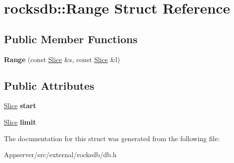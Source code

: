 \hypertarget{structrocksdb_1_1Range}{}\section{rocksdb\+:\+:Range Struct Reference}
\label{structrocksdb_1_1Range}
\subsection*{Public Member Functions}
\begin{DoxyCompactItemize}
\item 
{\bfseries Range} (const \hyperlink{classrocksdb_1_1Slice}{Slice} \&s, const \hyperlink{classrocksdb_1_1Slice}{Slice} \&l)\hypertarget{structrocksdb_1_1Range_aa9e9ddaf19885713b80da61baa7c5ce5}{}\label{structrocksdb_1_1Range_aa9e9ddaf19885713b80da61baa7c5ce5}

\end{DoxyCompactItemize}
\subsection*{Public Attributes}
\begin{DoxyCompactItemize}
\item 
\hyperlink{classrocksdb_1_1Slice}{Slice} {\bfseries start}\hypertarget{structrocksdb_1_1Range_a09f5596564d64ae5dc139bc8c69165d6}{}\label{structrocksdb_1_1Range_a09f5596564d64ae5dc139bc8c69165d6}

\item 
\hyperlink{classrocksdb_1_1Slice}{Slice} {\bfseries limit}\hypertarget{structrocksdb_1_1Range_ad6eb566d4b72991edafb8241981bfaa1}{}\label{structrocksdb_1_1Range_ad6eb566d4b72991edafb8241981bfaa1}

\end{DoxyCompactItemize}


The documentation for this struct was generated from the following file\+:\begin{DoxyCompactItemize}
\item 
Appserver/src/external/rocksdb/db.\+h\end{DoxyCompactItemize}
